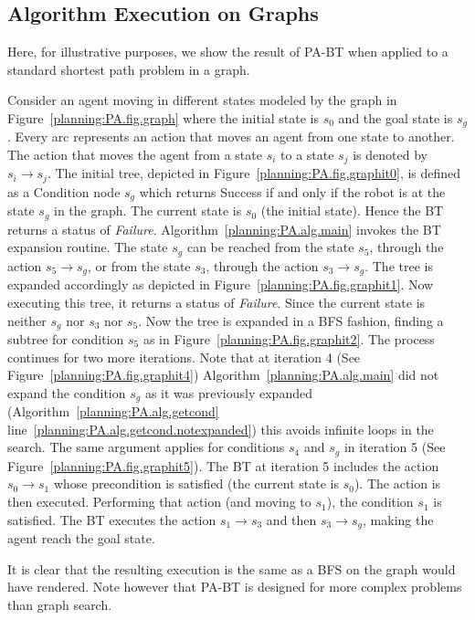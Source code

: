 \subsection{Algorithm Execution on Graphs}
Here, for illustrative purposes, we show the result of PA-BT when applied to a standard shortest path problem in a graph.


\begin{example}
\label{planning:PA.ex.graph}
Consider an agent moving in different states modeled by the graph in Figure~\ref{planning:PA.fig.graph} where the initial state is $s_0$ and the goal state is $s_g$. Every arc represents an action that moves an agent from one state to another. The  action that moves the agent from a state $s_i$ to a state $s_j$ is denoted by $s_i \to s_j$. 
The initial tree, depicted in Figure~\ref{planning:PA.fig.graphit0}, is defined as a Condition node $s_g$ which returns Success if and only if the robot is at the state $s_g$ in the graph. The current state is $s_0$ (the initial state). Hence the BT returns a status of \emph{Failure}. Algorithm~\ref{planning:PA.alg.main} invokes the BT expansion routine. The state $s_g$ can be reached from the state $s_5$, through the action $s_5\to s_g$, or from the state $s_3$, through the action $s_3\to s_g$. The tree is expanded accordingly as depicted in Figure~\ref{planning:PA.fig.graphit1}. Now executing this tree, it returns a status of \emph{Failure}. Since the current state is neither $s_g$ nor $s_3$ nor $s_5$.
Now the tree is expanded in a BFS fashion, finding a subtree for condition $s_5$ as in Figure~\ref{planning:PA.fig.graphit2}. The process continues for two more iterations.
Note that at iteration 4 (See Figure~\ref{planning:PA.fig.graphit4}) Algorithm~\ref{planning:PA.alg.main} did not expand the condition $s_g$ as it was previously expanded (Algorithm~\ref{planning:PA.alg.getcond} line~\ref{planning:PA.alg.getcond.notexpanded}) this avoids infinite loops in the search. The same argument applies for conditions $s_4$ and $s_g$ in iteration 5 (See Figure~\ref{planning:PA.fig.graphit5}). The BT at iteration 5 includes the action $s_0 \to s_1$ whose precondition is satisfied (the current state is $s_0$). The action is then executed. Performing that action (and moving to $s_1$), the condition $s_1$ is satisfied. The BT executes the action  $s_1 \to s_3$ and then $s_3 \to s_g$, making the agent reach the goal state.

It is clear that the resulting execution is  the same as a BFS on the graph would have rendered. Note however that PA-BT is designed for more complex problems than graph search.

\end{example}


